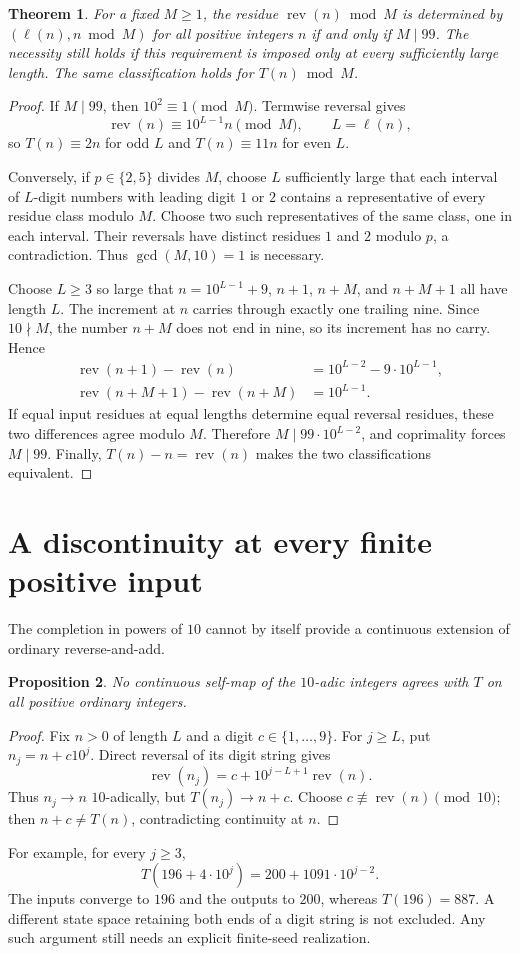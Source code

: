 \documentclass[11pt]{article}
\newtheorem{theorem}{Theorem}
\newtheorem{proposition}[theorem]{Proposition}
\newcommand{\rev}{\operatorname{rev}}
\newcommand{\len}{\ell}
\begin{document}
\begin{theorem}\label{thm:99}
For a fixed $M\geq1$, the residue $\rev(n)\bmod M$ is determined by
$(\len(n),n\bmod M)$ for all positive integers $n$ if and only if
$M\mid99$. The necessity still holds if this requirement is imposed
only at every sufficiently large length. The same classification holds
for $T(n)\bmod M$.
\end{theorem}
\begin{proof}
If $M\mid99$, then $10^2\equiv1\pmod M$. Termwise reversal gives
\[
 \rev(n)\equiv10^{L-1}n\pmod M,\qquad L=\len(n),
\]
so $T(n)\equiv2n$ for odd $L$ and $T(n)\equiv11n$ for even $L$.

Conversely, if $p\in\{2,5\}$ divides $M$, choose $L$ sufficiently large
that each interval of $L$-digit numbers with leading digit $1$ or $2$
contains a representative of every residue class modulo $M$. Choose two
such representatives of the same class, one in each interval. Their
reversals have distinct residues $1$ and $2$ modulo $p$, a contradiction.
Thus $\gcd(M,10)=1$ is necessary.

Choose $L\geq3$ so large that
$n=10^{L-1}+9$, $n+1$, $n+M$, and $n+M+1$ all have length $L$.
The increment at $n$ carries through exactly one trailing nine. Since
$10\nmid M$, the number $n+M$ does not end in nine, so its increment has
no carry. Hence
\begin{align*}
 \rev(n+1)-\rev(n)&=10^{L-2}-9\cdot10^{L-1},\\
 \rev(n+M+1)-\rev(n+M)&=10^{L-1}.
\end{align*}
If equal input residues at equal lengths determine equal reversal
residues, these two differences agree modulo $M$. Therefore
$M\mid99\cdot10^{L-2}$, and coprimality forces $M\mid99$.
Finally, $T(n)-n=\rev(n)$ makes the two classifications equivalent.
\end{proof}

\section{A discontinuity at every finite positive input}
The completion in powers of $10$ cannot by itself provide a continuous
extension of ordinary reverse-and-add.

\begin{proposition}\label{prop:adic}
No continuous self-map of the $10$-adic integers agrees with $T$ on all
positive ordinary integers.
\end{proposition}
\begin{proof}
Fix $n>0$ of length $L$ and a digit $c\in\{1,\ldots,9\}$. For $j\geq L$,
put $n_j=n+c10^j$. Direct reversal of its digit string gives
\[
 \rev(n_j)=c+10^{j-L+1}\rev(n).
\]
Thus $n_j\longrightarrow n$ $10$-adically, but
$T(n_j)\longrightarrow n+c$. Choose $c\not\equiv\rev(n)\pmod {10}$;
then $n+c\neq T(n)$, contradicting continuity at $n$.
\end{proof}
For example, for every $j\geq3$,
\[
 T(196+4\cdot10^j)=200+1091\cdot10^{j-2}.
\]
The inputs converge to $196$ and the outputs to $200$, whereas
$T(196)=887$. A different state space retaining both ends of a digit
string is not excluded. Any such argument still needs an explicit
finite-seed realization.
\end{document}
